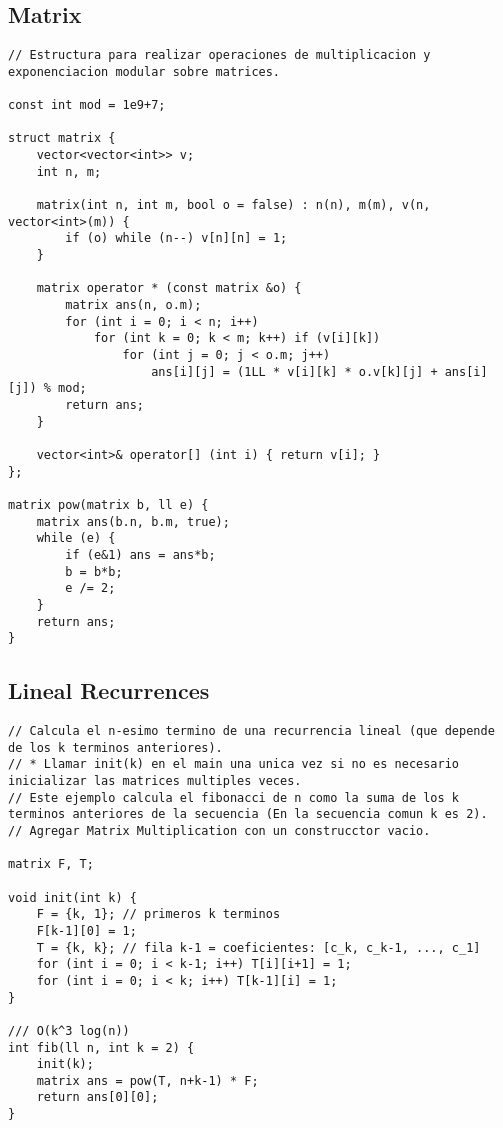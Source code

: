 \documentclass[10pt,letterpaper,twocolumn,twosided]{article}
\begin{document}
\subsection{Matrix}
\begin{lstlisting}
// Estructura para realizar operaciones de multiplicacion y exponenciacion modular sobre matrices.

const int mod = 1e9+7;

struct matrix {
    vector<vector<int>> v;
    int n, m;
    
    matrix(int n, int m, bool o = false) : n(n), m(m), v(n, vector<int>(m)) {
        if (o) while (n--) v[n][n] = 1;
    }

    matrix operator * (const matrix &o) {
        matrix ans(n, o.m);
        for (int i = 0; i < n; i++)
            for (int k = 0; k < m; k++) if (v[i][k])
                for (int j = 0; j < o.m; j++)
                    ans[i][j] = (1LL * v[i][k] * o.v[k][j] + ans[i][j]) % mod;
        return ans;
    }
    
    vector<int>& operator[] (int i) { return v[i]; }
};

matrix pow(matrix b, ll e) {
    matrix ans(b.n, b.m, true);
    while (e) {
        if (e&1) ans = ans*b;
        b = b*b;
        e /= 2;
    }
    return ans;
}
\end{lstlisting}

\subsection{Lineal Recurrences}
\begin{lstlisting}
// Calcula el n-esimo termino de una recurrencia lineal (que depende de los k terminos anteriores).
// * Llamar init(k) en el main una unica vez si no es necesario inicializar las matrices multiples veces.
// Este ejemplo calcula el fibonacci de n como la suma de los k terminos anteriores de la secuencia (En la secuencia comun k es 2).
// Agregar Matrix Multiplication con un construcctor vacio.

matrix F, T;

void init(int k) {
    F = {k, 1}; // primeros k terminos
    F[k-1][0] = 1;
    T = {k, k}; // fila k-1 = coeficientes: [c_k, c_k-1, ..., c_1]
    for (int i = 0; i < k-1; i++) T[i][i+1] = 1;
    for (int i = 0; i < k; i++) T[k-1][i] = 1;
}

/// O(k^3 log(n))
int fib(ll n, int k = 2) {
    init(k);
    matrix ans = pow(T, n+k-1) * F;
    return ans[0][0];
}
\end{lstlisting}
\end{document}
